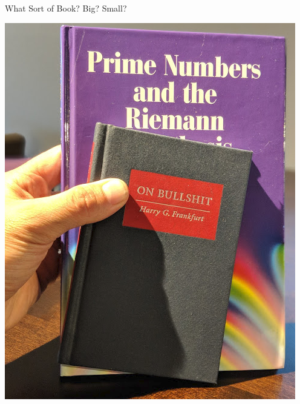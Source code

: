 \documentclass{beamer}
\begin{document}
\begin{frame}{What Sort of Book?  Big? Small?}
\begin{center}
    \includegraphics[height=.75\textheight]{pics/bullshit.png}
  \end{center}
\end{frame}
\end{document}
